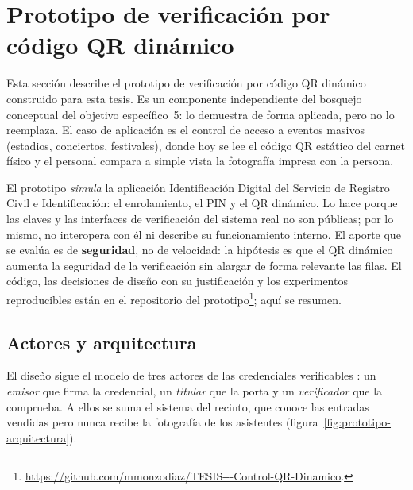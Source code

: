\section{Prototipo de verificación por código QR dinámico}
\label{sec:prototipo}

Esta sección describe el prototipo de verificación por código QR dinámico construido para esta
tesis. Es un componente independiente del bosquejo conceptual del objetivo específico~5: lo
demuestra de forma aplicada, pero no lo reemplaza. El caso de aplicación es el control de acceso
a eventos masivos (estadios, conciertos, festivales), donde hoy se lee el código QR estático del
carnet físico y el personal compara a simple vista la fotografía impresa con la persona.

El prototipo \emph{simula} la aplicación Identificación Digital del Servicio de Registro Civil e
Identificación: el enrolamiento, el PIN y el QR dinámico. Lo hace porque las claves y las
interfaces de verificación del sistema real no son públicas; por lo mismo, no interopera con él ni
describe su funcionamiento interno. El aporte que se evalúa es de \textbf{seguridad}, no de
velocidad: la hipótesis es que el QR dinámico aumenta la seguridad de la verificación sin alargar
de forma relevante las filas. El código, las decisiones de diseño con su justificación y los
experimentos reproducibles están en el repositorio del prototipo\footnote{%
  \url{https://github.com/mmonzodiaz/TESIS---Control-QR-Dinamico}. %
}; aquí se resumen.

\subsection{Actores y arquitectura}
\label{sec:prototipo-arquitectura}

El diseño sigue el modelo de tres actores de las credenciales verificables
\cite{PENDIENTE-w3c-vc}: un \emph{emisor} que firma la credencial, un \emph{titular} que la porta y
un \emph{verificador} que la comprueba. A ellos se suma el sistema del recinto, que conoce las
entradas vendidas pero nunca recibe la fotografía de los asistentes
(figura~\ref{fig:prototipo-arquitectura}).

